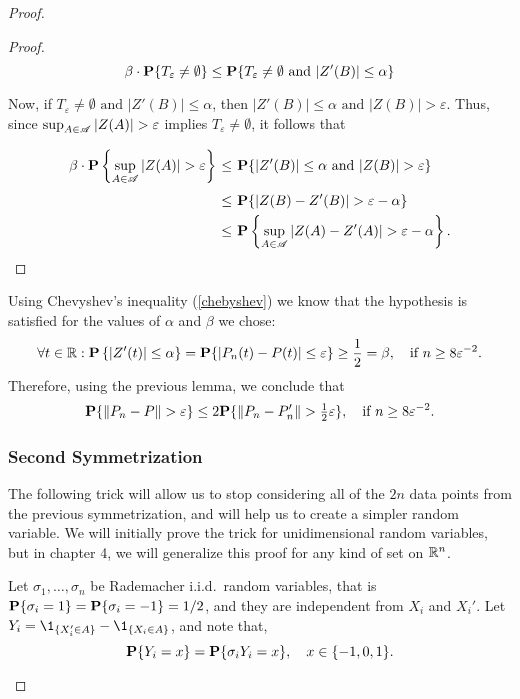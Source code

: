 \begin{proof}
\begin{proof}
    \[ \beta \cdot \P \{ T_\varepsilon \neq \emptyset\} \leq \P \{ T_\varepsilon \neq \emptyset \text{ and }  |Z'(B)|\leq \alpha \} \] 

    Now, if $T_\varepsilon \neq \emptyset \text{ and }  |Z'(B)|\leq \alpha  $, then $|Z'(B)| \leq \alpha\text{ and } |Z(B)| > \varepsilon$. Thus, since $\sup_{A\in \AA} |Z(A)| > \varepsilon$ implies $T_\varepsilon \neq \emptyset$, it follows that

    \[\everymath{\displaystyle}\arraycolsep=1.8pt\def\arraystretch{1.8}
    \begin{array}{rcl}
      \beta \cdot \P\left\{\sup_{A\in \AA} |Z(A)| > \varepsilon \right\} & \leq & \P\{|Z'(B)| \leq \alpha\text{ and } |Z(B)| > \varepsilon\}\\
       & \leq & \P\{ |Z(B) - Z'(B)| > \varepsilon - \alpha \}\\
        & \leq & \P\left\{\sup_{A\in \AA} |Z(A)-Z'(A)| > \varepsilon - \alpha \right\}.
    \end{array} \] 
  \end{proof}
  Using Chevyshev's inequality (\ref{chebyshev}) we know that the hypothesis is satisfied for the values of $\alpha$ and $\beta$ we chose:
  \[\forall t\in \R: \P\left\{ |Z'(t)| \leq \alpha \right\} = \P\{|P_n(t) - P(t)| \leq \varepsilon\} \geq \frac{1}{2} = \beta,\hspace*{1em} \text{if $n \geq 8\varepsilon^{-2}$}.\]
  Therefore, using the previous lemma, we conclude that
  \begin{equation}
    \label{gc:1} 
    \P\{\|P_n-P\| > \varepsilon\} \leq 2 \P\{\|P_n-P_n'\| > \tfrac{1}{2} \varepsilon\},\hspace*{1em} \text{if $n \geq 8\varepsilon^{-2}$}.
  \end{equation}

  \vspace*{1em}

  \subsubsection*{Second Symmetrization}
  The following trick will allow us to stop considering all of the $2n$ data points from the previous symmetrization, and will help us to create a simpler random variable. We will initially prove the trick for unidimensional random variables, but in chapter 4, we will generalize this proof for any kind of set on $\R^n$.

  \begin{lemma}\label{gc:l2}
    Let $\sigma_1, \ldots, \sigma_n$ be Rademacher i.i.d.~random variables, that is $\P\{\sigma_i = 1\} = \P\{\sigma_i = -1\} = 1/2$, and they are independent from $X_i$ and $X_i'$. Let $Y_i = \1_{\{ X_i' \in A\}} - \1_{\{ X_i \in A\}}$, and note that,
    \[ \P\{Y_i = x\} = \P\{\sigma_i Y_i = x\},\hspace*{1em} x \in \{-1,0,1\}. \] 
  \end{lemma}


\end{proof}
